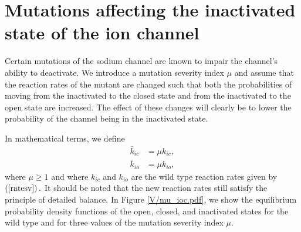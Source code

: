 

\section[Mutations affecting inactivation]{Mutations affecting the inactivated state of the ion channel\label{mutaffectinactiv}}

Certain mutations of the sodium channel are known to impair the
channel's ability to deactivate. We introduce a mutation severity index $\mu$
and assume that the reaction rates of the mutant are changed such that both
the probabilities of moving from the inactivated to the closed state and from the 
inactivated to the open state are increased. The effect of these changes will clearly be to lower 
the probability of the channel being in the inactivated state.

In mathematical terms, we define%
\begin{align}
\bar{k}_{ic} &  =\mu k_{ic},\label{ratesvm}\\
\bar{k}_{io} &  =\mu k_{io}, \nonumber
\end{align}
where $\mu\geqslant1$ and where $k_{ic}$ and $k_{io}$ are the wild type
reaction rates given by $\left(  \ref{ratesv}\right)  .$ It should be noted that the
new reaction rates still satisfy the principle of detailed balance. 
In Figure \ref{V/mu_ioc.pdf}, we show the equilibrium
probability density functions of the open, closed, and inactivated states for 
the wild type and for three values of the mutation severity index $\mu.$




